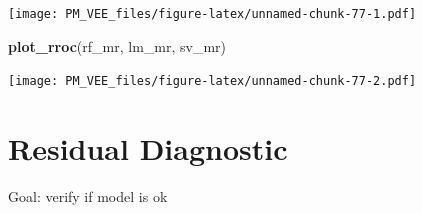 \documentclass[12pt,]{krantz}
\newenvironment{Shaded}{\begin{snugshade}}{\end{snugshade}}
\newcommand{\KeywordTok}[1]{\textcolor[rgb]{0.13,0.29,0.53}{\textbf{#1}}}
\newcommand{\NormalTok}[1]{#1}
\begin{document}
\texttt{[image: PM\_VEE\_files/figure-latex/unnamed-chunk-77-1.pdf]}

\begin{Shaded}
\begin{Highlighting}[]
\KeywordTok{plot_rroc}\NormalTok{(rf_mr, lm_mr, sv_mr)}
\end{Highlighting}
\end{Shaded}

\texttt{[image: PM\_VEE\_files/figure-latex/unnamed-chunk-77-2.pdf]}

\hypertarget{residualDiagnostic}{%
\section{Residual Diagnostic}\label{residualDiagnostic}}

Goal: verify if model is ok

\citep{R-auditor}
\end{document}
